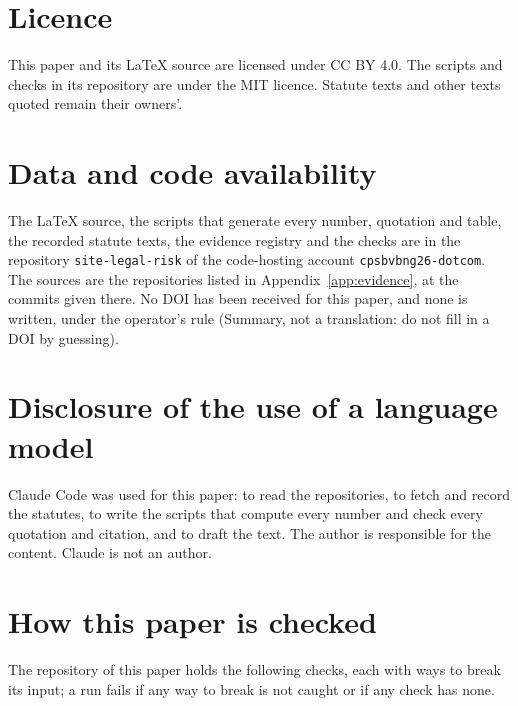 \documentclass[11pt]{article}
\newcommand{\srcq}[1]{\directlua{srcq("\luaescapestring{#1}")}}
\newcommand{\summ}[1]{(Summary, not a translation: #1)}
\begin{document}
\section*{Licence}
This paper and its LaTeX source are licensed under CC BY 4.0. The scripts and checks in its repository are under the MIT licence. Statute texts and other texts quoted remain their owners'.

\section*{Data and code availability}
The LaTeX source, the scripts that generate every number, quotation and table, the recorded statute texts, the evidence registry and the checks are in the repository \texttt{site-legal-risk} of the code-hosting account \texttt{cpsbvbng26-dotcom}. The sources are the repositories listed in Appendix~\ref{app:evidence}, at the commits given there. No DOI has been received for this paper, and none is written, under the operator's rule \srcq{claude-doi} \summ{do not fill in a DOI by guessing}.

\section*{Disclosure of the use of a language model}
Claude Code was used for this paper: to read the repositories, to fetch and record the statutes, to write the scripts that compute every number and check every quotation and citation, and to draft the text. The author is responsible for the content. Claude is not an author.

\appendix
\section{How this paper is checked}\label{sec:repro}

The repository of this paper holds the following checks, each with ways to break its input; a run fails if any way to break is not caught or if any check has none.
\end{document}
